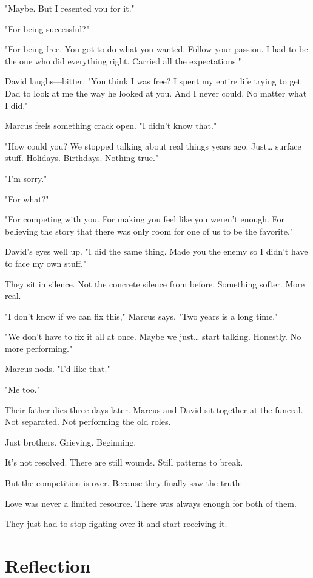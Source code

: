 \documentclass[11pt,twoside]{book}
\begin{document}
"Maybe. But I resented you for it."

"For being successful?"

"For being free. You got to do what you wanted. Follow your passion. I had to be the one who did everything right. Carried all the expectations."

David laughs—bitter. "You think I was free? I spent my entire life trying to get Dad to look at me the way he looked at you. And I never could. No matter what I did."

Marcus feels something crack open. "I didn't know that."

"How could you? We stopped talking about real things years ago. Just\ldots{} surface stuff. Holidays. Birthdays. Nothing true."

"I'm sorry."

"For what?"

"For competing with you. For making you feel like you weren't enough. For believing the story that there was only room for one of us to be the favorite."

David's eyes well up. "I did the same thing. Made you the enemy so I didn't have to face my own stuff."

They sit in silence. Not the concrete silence from before. Something softer. More real.

"I don't know if we can fix this," Marcus says. "Two years is a long time."

"We don't have to fix it all at once. Maybe we just\ldots{} start talking. Honestly. No more performing."

Marcus nods. "I'd like that."

"Me too."

Their father dies three days later. Marcus and David sit together at the funeral. Not separated. Not performing the old roles.

Just brothers. Grieving. Beginning.

It's not resolved. There are still wounds. Still patterns to break.

But the competition is over. Because they finally saw the truth:

Love was never a limited resource. There was always enough for both of them.

They just had to stop fighting over it and start receiving it.

\section*{Reflection}
\end{document}

